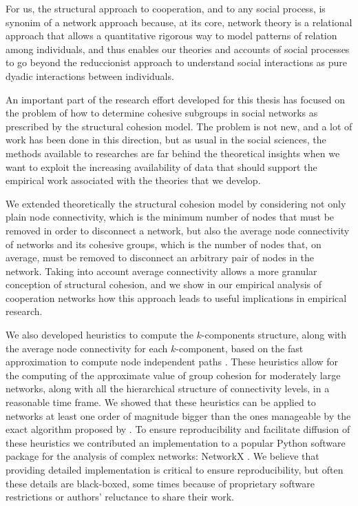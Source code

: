 For us, the structural approach to cooperation, and to any social process, is synonim of a network approach because, at its core, network theory is a relational approach that allows a quantitative rigorous way to model patterns of relation among individuals, and thus enables our theories and accounts of social processes to go beyond the reduccionist approach to understand social interactions as pure dyadic interactions between individuals.

An important part of the research effort developed for this thesis has focused on the problem of how to determine cohesive subgroups in social networks as prescribed by the structural cohesion model. The problem is not new, and a lot of work has been done in this direction, but as usual in the social sciences, the methods available to researches are far behind the theoretical insights when we want to exploit the increasing availability of data that should support the empirical work associated with the theories that we develop.

We extended theoretically the structural cohesion model by considering not only plain node connectivity, which is the minimum number of nodes that must be removed in order to disconnect a network, but also the average node connectivity of networks and its cohesive groups, which is the number of nodes that, on average, must be removed to disconnect an arbitrary pair of nodes in the network. Taking into account average connectivity allows a more granular conception of structural cohesion, and we show in our empirical analysis of cooperation networks how this approach leads to useful implications in empirical research.

We also developed heuristics to compute the $k$-components structure, along with the average node connectivity for each $k$-component, based on the fast approximation to compute node independent paths \citep{white:2001b}. These heuristics allow for the computing of the approximate value of group cohesion for moderately large networks, along with all the hierarchical structure of connectivity levels, in a reasonable time frame. We showed that these heuristics can be applied to networks at least one order of magnitude bigger than the ones manageable by the exact algorithm proposed by \citet{moody:2003}. To ensure reproducibility and facilitate diffusion of these heuristics we contributed an implementation to a popular Python software package for the analysis of complex networks: NetworkX \citep{hagberg:2008}. We believe that providing detailed implementation is critical to ensure reproducibility, but often these details are black-boxed, some times because of proprietary software restrictions or authors' reluctance to share their work.

